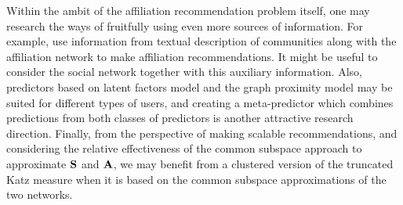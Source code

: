Within the ambit of the affiliation recommendation problem itself, one may research the ways of fruitfully using even more sources of information. For example, \cite{GoogleCCF} use information from textual description of communities along with the affiliation network to make affiliation recommendations. It might be useful to consider the social network together with this auxiliary information. Also, predictors based on latent factors model and the graph proximity model may be suited for different types of users, and creating a meta-predictor which combines predictions from both classes of predictors is another attractive research direction. Finally,  from the perspective of making scalable recommendations, and considering the relative effectiveness of the common subspace approach to approximate $\mathbf{S}$ and $\mathbf{A}$, we may benefit from a clustered version of the truncated \textsf{Katz} measure when it is based on the common subspace approximations of the two networks. 